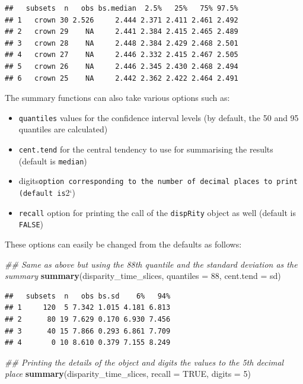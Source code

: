 \documentclass[]{book}
\newenvironment{Shaded}{\begin{snugshade}}{\end{snugshade}}
\newcommand{\CommentTok}[1]{\textcolor[rgb]{0.56,0.35,0.01}{\textit{#1}}}
\newcommand{\DataTypeTok}[1]{\textcolor[rgb]{0.13,0.29,0.53}{#1}}
\newcommand{\DecValTok}[1]{\textcolor[rgb]{0.00,0.00,0.81}{#1}}
\newcommand{\KeywordTok}[1]{\textcolor[rgb]{0.13,0.29,0.53}{\textbf{#1}}}
\newcommand{\NormalTok}[1]{#1}
\newcommand{\OtherTok}[1]{\textcolor[rgb]{0.56,0.35,0.01}{#1}}
\providecommand{\tightlist}{%
  \setlength{\itemsep}{0pt}\setlength{\parskip}{0pt}}
\begin{document}
\begin{verbatim}
##   subsets  n   obs bs.median  2.5%   25%   75% 97.5%
## 1   crown 30 2.526     2.444 2.371 2.411 2.461 2.492
## 2   crown 29    NA     2.441 2.384 2.415 2.465 2.489
## 3   crown 28    NA     2.448 2.384 2.429 2.468 2.501
## 4   crown 27    NA     2.446 2.332 2.415 2.467 2.505
## 5   crown 26    NA     2.446 2.345 2.430 2.468 2.494
## 6   crown 25    NA     2.442 2.362 2.422 2.464 2.491
\end{verbatim}

The summary functions can also take various options such as:

\begin{itemize}
\tightlist
\item
  \texttt{quantiles} values for the confidence interval levels (by default, the 50 and 95 quantiles are calculated)
\item
  \texttt{cent.tend} for the central tendency to use for summarising the results (default is \texttt{median})
\item
  digits\texttt{option\ corresponding\ to\ the\ number\ of\ decimal\ places\ to\ print\ (default\ is}2`)
\item
  \texttt{recall} option for printing the call of the \texttt{dispRity} object as well (default is \texttt{FALSE})
\end{itemize}

These options can easily be changed from the defaults as follows:

\begin{Shaded}
\begin{Highlighting}[]
\CommentTok{## Same as above but using the 88th quantile and the standard deviation as the summary }
\KeywordTok{summary}\NormalTok{(disparity_time_slices, }\DataTypeTok{quantiles =} \DecValTok{88}\NormalTok{, }\DataTypeTok{cent.tend =}\NormalTok{ sd)}
\end{Highlighting}
\end{Shaded}

\begin{verbatim}
##   subsets  n   obs bs.sd    6%   94%
## 1     120  5 7.342 1.015 4.181 6.813
## 2      80 19 7.629 0.170 6.930 7.456
## 3      40 15 7.866 0.293 6.861 7.709
## 4       0 10 8.610 0.379 7.155 8.249
\end{verbatim}

\begin{Shaded}
\begin{Highlighting}[]
\CommentTok{## Printing the details of the object and digits the values to the 5th decimal place}
\KeywordTok{summary}\NormalTok{(disparity_time_slices, }\DataTypeTok{recall =} \OtherTok{TRUE}\NormalTok{, }\DataTypeTok{digits =} \DecValTok{5}\NormalTok{)}
\end{Highlighting}
\end{Shaded}
\end{document}
